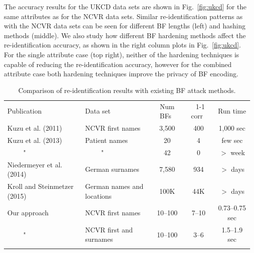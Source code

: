 \documentclass{llncs}
\begin{document}
The accuracy results for the UKCD data sets are shown in
Fig.~\ref{fig:ukcd} for the same attributes as for the NCVR data
sets. Similar re-identification patterns as with the NCVR data sets
can be seen for different BF lengths (left) and hashing methods
(middle). We also study how different BF hardening methods affect the
re-identification accuracy, as shown in the right column plots in
Fig.~\ref{fig:ukcd}. For the single attribute case (top right),
neither of the hardening techniques is capable of reducing the
re-identification accuracy, however for the combined attribute
case both hardening techniques improve the privacy of BF encoding.

\begin{table}[!t]
  \caption{Comparison of re-identification results with existing BF
     attack methods.}
     \label{table:exist_approaches}
  \centering
  \begin{scriptsize}
    \begin{tabular}{llccc}
    \hline\noalign{\smallskip}
   Publication & Data set & Num BFs~ & ~1-1 corr~ & Run time
     \\ \noalign{\smallskip}\hline\noalign{\smallskip}
  Kuzu et al. (2011)~\cite{Kuz11} & NCVR first names & 3,500 & 400 &
    1,000 sec \\
  Kuzu et al. (2013)~\cite{Kuz13} & Patient names & 20 & 4 & 
    few sec \\
  ~~~~ " & ~~~~ " & 42 & 0 & $>$ week \\
  Niedermeyer et al. (2014)~\cite{Nie14}~ & German surnames & 7,580 &
    934 & $>$ days  \\
  Kroll and Steinmetzer (2015)~\cite{Kro15}~ & German names and
    locations & 100K & 44K & $>$ days \\
  Our approach & NCVR first names & 10--100 & 7--10 & 0.73--0.75 sec
    \\
  ~~~~ " & NCVR first and surnames & 10--100 & 3--6 & 1.5--1.9
  sec  \\
  \noalign{\smallskip} \hline
  \end{tabular}
  \end{scriptsize}
\end{table}

%
\end{document}
